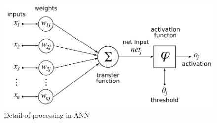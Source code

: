 \begin{center}
	\begin{figure}[H]
		\centering
		\includegraphics[width=0.75\columnwidth]{images/chap2/ANN_detail.png}
		\caption{Detail of processing in ANN}
		\label{chap2:neural_net_detail}
		
	\end{figure}
\end{center}
\vspace{-1cm}
